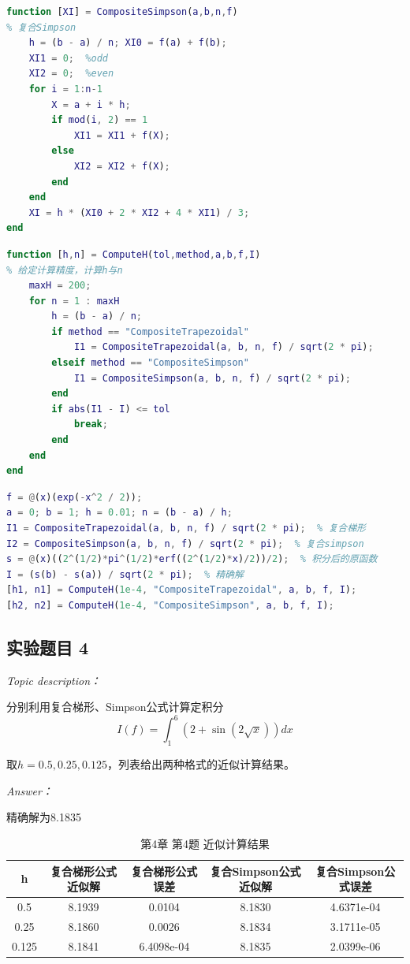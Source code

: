 \documentclass[12pt]{ctexart}
\begin{document}
\begin{lstlisting}[language = MATLAB]
function [XI] = CompositeSimpson(a,b,n,f)
% 复合Simpson
	h = (b - a) / n; XI0 = f(a) + f(b);
	XI1 = 0;  %odd
	XI2 = 0;  %even
	for i = 1:n-1
		X = a + i * h;
		if mod(i, 2) == 1
			XI1 = XI1 + f(X);
		else
			XI2 = XI2 + f(X);
		end
	end
	XI = h * (XI0 + 2 * XI2 + 4 * XI1) / 3;
end
\end{lstlisting}

\begin{lstlisting}[language = MATLAB]
function [h,n] = ComputeH(tol,method,a,b,f,I)
% 给定计算精度，计算h与n
	maxH = 200;
	for n = 1 : maxH
		h = (b - a) / n;
		if method == "CompositeTrapezoidal"
			I1 = CompositeTrapezoidal(a, b, n, f) / sqrt(2 * pi);
		elseif method == "CompositeSimpson"
			I1 = CompositeSimpson(a, b, n, f) / sqrt(2 * pi);
		end
		if abs(I1 - I) <= tol
			break;
		end
	end
end
\end{lstlisting}

\begin{lstlisting}[language = MATLAB]
% 第4章 第3题
f = @(x)(exp(-x^2 / 2));
a = 0; b = 1; h = 0.01; n = (b - a) / h;
I1 = CompositeTrapezoidal(a, b, n, f) / sqrt(2 * pi);  % 复合梯形
I2 = CompositeSimpson(a, b, n, f) / sqrt(2 * pi);  % 复合simpson
s = @(x)((2^(1/2)*pi^(1/2)*erf((2^(1/2)*x)/2))/2);  % 积分后的原函数
I = (s(b) - s(a)) / sqrt(2 * pi);  % 精确解
[h1, n1] = ComputeH(1e-4, "CompositeTrapezoidal", a, b, f, I);
[h2, n2] = ComputeH(1e-4, "CompositeSimpson", a, b, f, I);
\end{lstlisting}

	\subsection{实验题目 4}
	\textit{Topic description：}
	
	分别利用复合梯形、Simpson公式计算定积分
	\begin{equation*}
	I(f)=\int_1^6(2+\sin(2\sqrt{x}))dx
	\end{equation*}
	
	取$h=0.5,0.25,0.125$，列表给出两种格式的近似计算结果。
	
	\textit{Answer：}
	
	精确解为8.1835
	
	\begin{table}[htbp]
		\centering
		\caption{第4章 第4题 近似计算结果}\label{e4_4}
		\begin{tabular}
			{c|c|c|c|c}
			\hline
			h&复合梯形公式近似解&复合梯形公式误差&复合Simpson公式近似解&复合Simpson公式误差 \\
			\hline
			0.5&8.1939&0.0104&8.1830&4.6371e-04 \\
			\hline
			0.25&8.1860&0.0026&8.1834&3.1711e-05 \\
			\hline
			0.125&8.1841&6.4098e-04&8.1835&2.0399e-06 \\
			\hline
		\end{tabular}
	\end{table}
\end{document}
